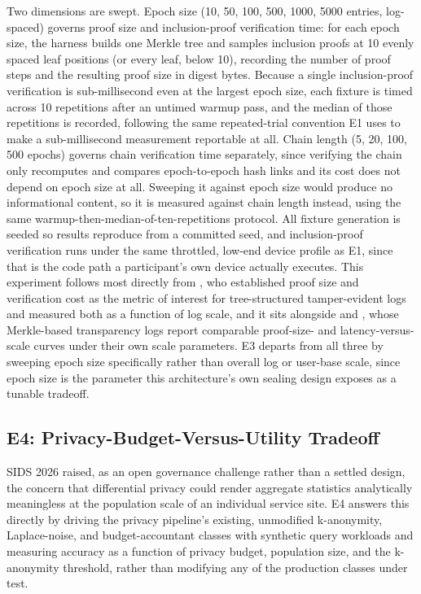 Two dimensions are swept. Epoch size (10, 50, 100, 500, 1000, 5000 entries, log-spaced) governs proof size and inclusion-proof verification time: for each epoch size, the harness builds one Merkle tree and samples inclusion proofs at 10 evenly spaced leaf positions (or every leaf, below 10), recording the number of proof steps and the resulting proof size in digest bytes. Because a single inclusion-proof verification is sub-millisecond even at the largest epoch size, each fixture is timed across 10 repetitions after an untimed warmup pass, and the median of those repetitions is recorded, following the same repeated-trial convention E1 uses to make a sub-millisecond measurement reportable at all. Chain length (5, 20, 100, 500 epochs) governs chain verification time separately, since verifying the chain only recomputes and compares epoch-to-epoch hash links and its cost does not depend on epoch size at all. Sweeping it against epoch size would produce no informational content, so it is measured against chain length instead, using the same warmup-then-median-of-ten-repetitions protocol. All fixture generation is seeded so results reproduce from a committed seed, and inclusion-proof verification runs under the same throttled, low-end device profile as E1, since that is the code path a participant's own device actually executes. This experiment follows most directly from \cite{crosby2009}, who established proof size and verification cost as the metric of interest for tree-structured tamper-evident logs and measured both as a function of log scale, and it sits alongside \cite{melara2015} and \cite{hu2021}, whose Merkle-based transparency logs report comparable proof-size- and latency-versus-scale curves under their own scale parameters. E3 departs from all three by sweeping epoch size specifically rather than overall log or user-base scale, since epoch size is the parameter this architecture's own sealing design exposes as a tunable tradeoff.

\subsection{E4: Privacy-Budget-Versus-Utility Tradeoff}

SIDS 2026 raised, as an open governance challenge rather than a settled design, the concern that differential privacy could render aggregate statistics analytically meaningless at the population scale of an individual service site. E4 answers this directly by driving the privacy pipeline's existing, unmodified k-anonymity, Laplace-noise, and budget-accountant classes with synthetic query workloads and measuring accuracy as a function of privacy budget, population size, and the k-anonymity threshold, rather than modifying any of the production classes under test.

